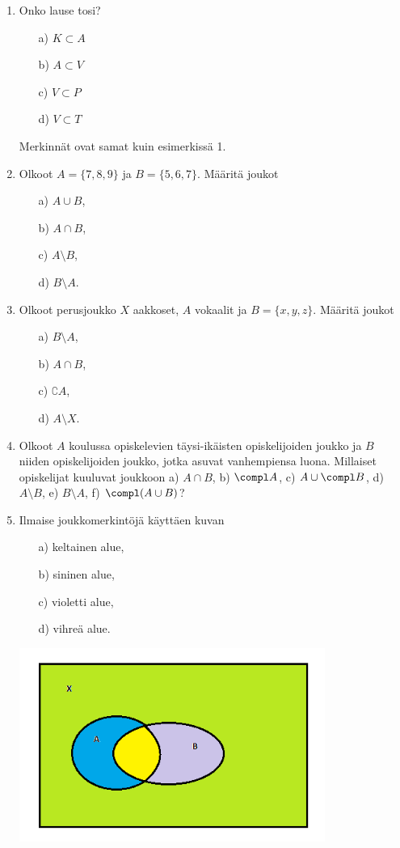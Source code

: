 \begin{enumerate}

\item Onko lause tosi?
\begin{itemize}
\item[a)] $K \subset A$
\item[b)] $A \subset V$
\item[c)] $V \subset P$
\item[d)] $V \subset T$
\end{itemize}
Merkinnät ovat samat kuin esimerkissä 1.

\item Olkoot $A = \{7,8,9\}$ ja $B=\{5,6,7\}$. Määritä joukot
\begin{itemize}
\item[a)] $A \cup B$,
\item[b)] $A \cap B$,
\item[c)] $A \setminus B$,
\item[d)] $B \setminus A$.
\end{itemize}

\item Olkoot perusjoukko $X$ aakkoset, $A$ vokaalit ja $B=\{x,y,z\}$.
Määritä joukot
\begin{itemize}
\item[a)] $B\setminus A$,
\item[b)] $A\cap B$,
\item[c)] $\complement A$,
\item[d)] $A \setminus X$.
\end{itemize}


\item
Olkoot $A$ koulussa opiskelevien täysi-ikäisten opiskelijoiden joukko ja $B$ niiden opiskelijoiden joukko, jotka asuvat vanhempiensa luona. Millaiset opiskelijat kuuluvat joukkoon a) $A \cap B$,  b) $\compl A$, c) $A \cup \compl B$, d) $A\setminus B$, e) $B \setminus A$, f) $\compl (A \cup B)$?

\item
Ilmaise joukkomerkintöjä käyttäen kuvan
\begin{itemize}
\item[a)] keltainen alue,
\item[b)] sininen alue,
\item[c)] violetti alue,
\item[d)] vihreä alue.
\end{itemize}

\begin{center}
\includegraphics[width=10cm]{kuvat/mika2}
\end{center}


\end{enumerate}
